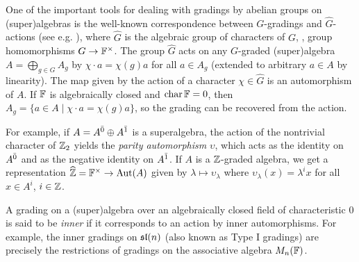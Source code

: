 One of the important tools for dealing with gradings by abelian groups on (super)algebras is the well-known correspondence between  $G$-gradings and $\widehat G$-actions (see e.g. \cite[\S 1.4]{livromicha}), where $\widehat G$ is the algebraic group of characters of $G$, \ie, group homomorphisms $G \rightarrow \mathbb{F}^{\times}$. The group $\widehat{G}$ acts on any $G$-graded (super)algebra $A = \bigoplus_{g\in G} A_g$ by $\chi \cdot a = \chi(g) a$ for all $a\in A_g$ (extended to arbitrary $a\in A$ by linearity). The map given by the action of a character $\chi \in \widehat{G}$ is an automorphism of $A$. If $\mathbb{F}$ is algebraically closed and $\operatorname{char} \mathbb{F} = 0$, then $A_g = \{ a\in A \mid \chi \cdot a = \chi (g) a\}$, so the grading can be recovered from the action.

For example, if $A=A^{\bar0} \oplus A^{\bar1}$ is a superalgebra, the action of the nontrivial character of $\mathbb{Z}_2$ yields the \emph{parity automorphism} $\upsilon$, which acts as the identity on $A^{\bar0}$ and as the negative identity on $A^{\bar1}$. If $A$ is a $\mathbb{Z}$-graded algebra, we get a representation $\widehat {\mathbb{Z}} = \mathbb{F}^\times \rightarrow \operatorname{Aut} (A)$ given by $\lambda \mapsto \upsilon_\lambda$ where $\upsilon_{\lambda} (x) = \lambda^i x$ for all $x\in A^i$, $i\in \mathbb{Z}$.

A grading on a (super)algebra over an algebraically closed field of characteristic $0$ is said to be \emph{inner} if it corresponds to an action by inner automorphisms. For example, the inner gradings on $\mathfrak{sl}(n)$ (also known as Type I gradings) are precisely the restrictions of gradings on the associative algebra $M_n(\mathbb{F})$.
